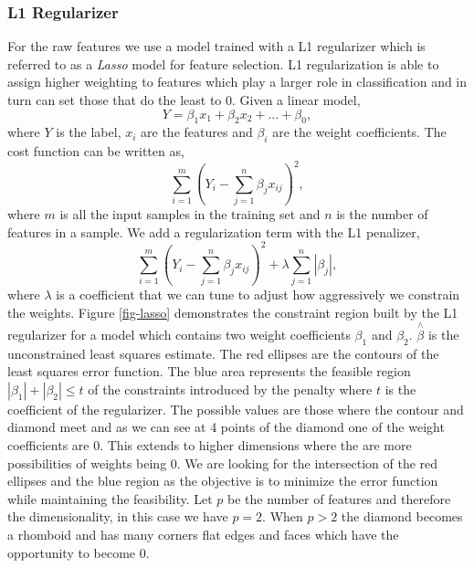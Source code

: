 \subsubsection{L1 Regularizer} For the raw features we use a model trained with a L1 regularizer which is referred to as a \emph{Lasso} model for feature selection. L1 regularization is able to assign higher weighting to features which play a larger role in classification and in turn can set those that do the least to 0. 
Given a linear model,
\begin{equation}
Y = \beta_{1}x_{1} + \beta_{2}x_{2} + ... + \beta_{0},
\end{equation}
where $Y$ is the label, $x_{i}$ are the features and $\beta_{i}$ are the weight coefficients.
The cost function can be written as,
\begin{equation}
\sum_{i=1}^{m}(Y_{i} - \sum_{j=1}^{n} \beta_{j}x_{ij})^{2},
\end{equation}
where $m$ is all the input samples in the training set and $n$ is the number of features in a sample.
We add a regularization term with the L1 penalizer,
\begin{equation}
        \sum_{i=1}^{m}(Y_{i} - \sum_{j=1}^{n} \beta_{j}x_{ij})^{2} + \lambda \sum_{j=1}^{n} |\beta_{j}|,
\end{equation}
where $\lambda$ is a coefficient that we can tune to adjust how aggressively we constrain the weights. Figure \ref{fig-lasso} demonstrates the constraint region built by the L1 regularizer for a model which contains two weight coefficients $\beta_{1}$ and $\beta_{2}$. $\overset{\wedge}{\beta}$ is the unconstrained least squares estimate. The red ellipses are the contours of the least squares error function. The blue area represents the feasible region $|\beta_{1}| + |\beta_{2}| \leq t$ of the constraints introduced by the penalty where $t$ is the coefficient of the regularizer. The possible values are those where the contour and diamond meet and as we can see  at 4 points of the diamond one of the weight coefficients are 0. This extends to higher dimensions where the are more possibilities of weights being 0. We are looking for the intersection of the red ellipses and the blue region as the objective is to minimize the error function while maintaining the feasibility. Let $p$ be the number of features and therefore the dimensionality, in this case we have $p = 2$. When $p > 2$ the diamond becomes a rhomboid and has many corners flat edges and faces which have the opportunity to become 0.
